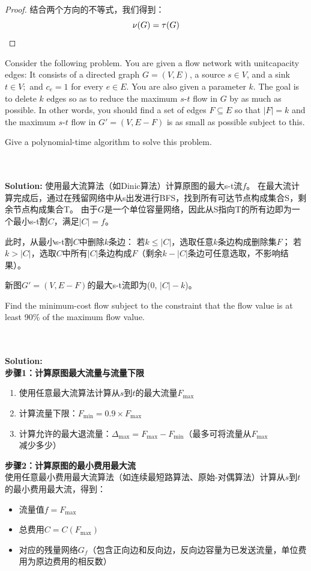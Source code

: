\documentclass{article}
\newcounter{exercise}
\newcommand{\<}{
    \langle}
\renewcommand{\>}{
    \rangle}
\begin{document}
{\begin{proof}
结合两个方向的不等式，我们得到：
\[
\nu(G) = \tau(G)
\]
\end{proof}

\begin{exercise}
Consider the following problem. You are given a flow network with unitcapacity
edges: It consists of a directed graph $G = (V, E)$, a source $s \in V$,
and a sink $t\in V;$ and $c_e = 1$ for every $e\in E$. You are also given a parameter $k$.
The goal is to delete $k$ edges so as to reduce the maximum $s$-$t$ flow in
$G$ by as much as possible. In other words, you should find a set of edges
$F \subseteq E$ so that $|F| = k$ and the maximum $s$-$t$ flow in $G' = (V, E-F)$ is as small
as possible subject to this.

Give a polynomial-time algorithm to solve this problem.
\end{exercise}
\\\\
\noindent\textbf{Solution:}
使用最大流算法（如Dinic算法）计算原图的最大s-t流$f$。
在最大流计算完成后，通过在残留网络中从s出发进行BFS，找到所有可达节点构成集合S，剩余节点构成集合T。
由于$G$是一个单位容量网络，因此从S指向T的所有边即为一个最小s-t割$C$，满足$|C| = f$。

此时，从最小s-t割$C$中删除$k$条边：
若$k \leq |C|$，选取任意$k$条边构成删除集$F$；
若$k > |C|$，选取$C$中所有$|C|$条边构成$F$（剩余$k - |C|$条边可任意选取，不影响结果）。

新图$G' = (V, E - F)$的最大s-t流即为\max(0, $|C| - k$)。

\begin{exercise}
 Find the minimum-cost flow subject to the constraint that the flow value is at
least 90\% of the maximum flow value.
\end{exercise}
\\\\
\noindent\textbf{Solution:}
\\
\noindent\textbf{步骤1：计算原图最大流量与流量下限}
\begin{enumerate}
    \item 使用任意最大流算法计算从$s$到$t$的最大流量$F_{\text{max}}$
    \item 计算流量下限：$F_{\text{min}}=0.9\times F_{\text{max}}$
    \item 计算允许的最大退流量：$\Delta_{\text{max}}=F_{\text{max}}-F_{\text{min}}$（最多可将流量从$F_{\text{max}}$减少多少）
\end{enumerate}

\noindent\textbf{步骤2：计算原图的最小费用最大流} \\
使用任意最小费用最大流算法（如连续最短路算法、原始-对偶算法）计算从$s$到$t$的最小费用最大流，得到：
\begin{itemize}
    \item 流量值$f=F_{\text{max}}$
    \item 总费用$C=C(F_{\text{max}})$
    \item 对应的残量网络$G_f$（包含正向边和反向边，反向边容量为已发送流量，单位费用为原边费用的相反数）
\end{itemize}

}
\end{document}
